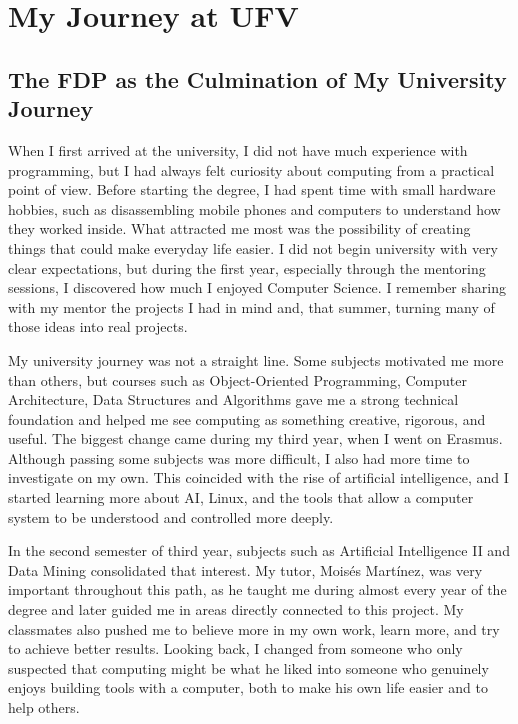 \chapter{My Journey at UFV}
\setcounter{section}{0}

\section{The FDP as the Culmination of My University Journey}

When I first arrived at the university, I did not have much experience with programming, but I had always felt curiosity about computing from a practical point of view. Before starting the degree, I had spent time with small hardware hobbies, such as disassembling mobile phones and computers to understand how they worked inside. What attracted me most was the possibility of creating things that could make everyday life easier. I did not begin university with very clear expectations, but during the first year, especially through the mentoring sessions, I discovered how much I enjoyed Computer Science. I remember sharing with my mentor the projects I had in mind and, that summer, turning many of those ideas into real projects.

My university journey was not a straight line. Some subjects motivated me more than others, but courses such as Object-Oriented Programming, Computer Architecture, Data Structures and Algorithms gave me a strong technical foundation and helped me see computing as something creative, rigorous, and useful. The biggest change came during my third year, when I went on Erasmus. Although passing some subjects was more difficult, I also had more time to investigate on my own. This coincided with the rise of artificial intelligence, and I started learning more about AI, Linux, and the tools that allow a computer system to be understood and controlled more deeply.

In the second semester of third year, subjects such as Artificial Intelligence II and Data Mining consolidated that interest. My tutor, Mois{\'e}s Mart{\'i}nez, was very important throughout this path, as he taught me during almost every year of the degree and later guided me in areas directly connected to this project. My classmates also pushed me to believe more in my own work, learn more, and try to achieve better results. Looking back, I changed from someone who only suspected that computing might be what he liked into someone who genuinely enjoys building tools with a computer, both to make his own life easier and to help others.

